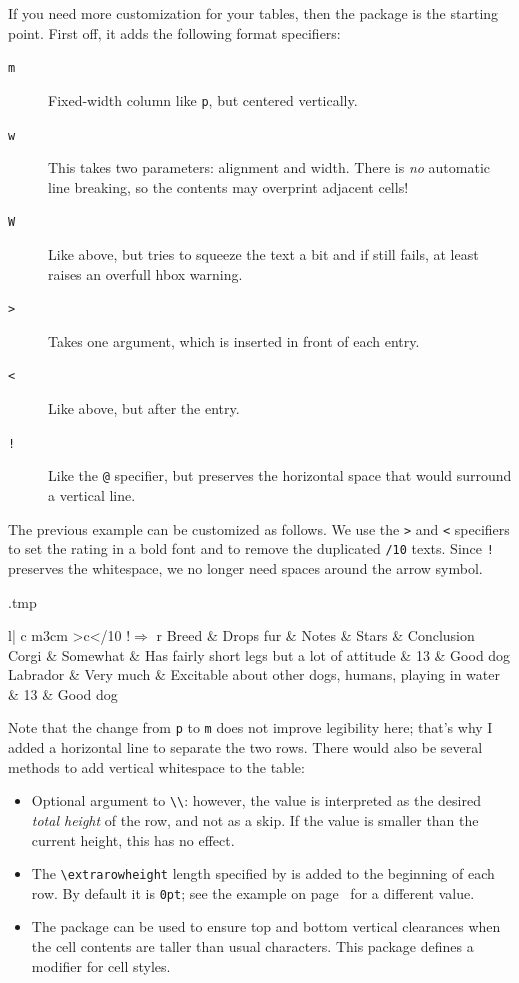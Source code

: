 If you need more customization for your tables, then the  package is the starting point.
First off, it adds the following format specifiers:
\begin{description}
\item[\texttt{m}] Fixed-width column like \verb|p|, but centered vertically.
\item[\texttt{w}] This takes two parameters: alignment and width.
    There is \emph{no} automatic line breaking,
    so the contents may overprint adjacent cells!
\item[\texttt{W}] Like above, but tries to squeeze the text a bit and if still fails,
    at least raises an overfull hbox warning.
\item[\texttt{>}] Takes one argument, which is inserted in front of each entry.
\item[\texttt{<}] Like above, but after the entry.
\item[\texttt{!}] Like the \verb|@| specifier,
    but preserves the horizontal space that would surround a vertical line.
\end{description}

The previous example can be customized as follows.
We use the \verb|>| and \verb|<| specifiers to set the rating in a bold font
and to remove the duplicated \verb|/10| texts.
Since \verb|!| preserves the whitespace,
we no longer need spaces around the arrow symbol.
%
\begin{VerbatimOut}{\jobname.tmp}
\begin{tabular}{l| c m{3cm} >{\bfseries}c<{/10} !{$\Rightarrow$} r}
Breed & Drops fur & Notes & Stars & Conclusion\\
\hline
Corgi & Somewhat & Has fairly short legs but a lot of attitude
    & 13 & Good dog\\
\hline
Labrador & Very much & Excitable about other dogs, humans, playing in water
    & 13 & Good dog
\end{tabular}
\end{VerbatimOut}
\ShowExampleBelow
%
Note that the change from \texttt{p} to \texttt{m} does not improve legibility here;
that's why I added a horizontal line to separate the two rows.
There would also be several methods to add vertical whitespace to the table:
\begin{itemize}
\item Optional argument to \verb|\\|:
    however, the value is interpreted as the desired \emph{total height} of the row,
    and not as a skip.
    If the value is smaller than the current height, this has no effect.
\item The \verb|\extrarowheight| length specified by 
    is added to the beginning of each row.
    By default it is \verb|0pt|;
    see the example on page~\pageref{ex:extrarowheight} for a different value.
\item The  package can be used to ensure top and bottom vertical clearances
    when the cell contents are taller than usual characters.
    This package defines a modifier for cell styles.
\end{itemize}


